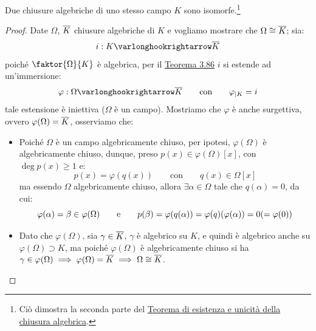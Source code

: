 \documentclass[11pt]{scrartcl}
\begin{document}
\pagebreak

\begin{corollary}
Due chiusure algebriche di uno stesso campo $K$ sono isomorfe.\footnote{Ciò dimostra la seconda parte del \hyperref[3.25]{Teorema di esistenza e unicità della chiusura algebrica}.}
\end{corollary}

\begin{proof}
Date $\Omega$, $\overline K$ chiusure algebriche di $K$ e vogliamo mostrare che $\Omega \cong \overline K$; sia:
\[ i : K \varlonghookrightarrow \ol K
    \]
poiché $\faktor{\Omega}{K}$ è algebrica, per il \hyperref[3.86]{Teorema 3.86} $i$ si estende ad un'immersione:
\[ \varphi : \Omega \varlonghookrightarrow \ol K \qquad \text{con} \qquad \varphi_{|K} = i
    \]
tale estensione è iniettiva ($\Omega$ è un campo). Mostriamo che $\varphi$ è anche surgettiva, ovvero $\varphi(\Omega) = \overline K$, osserviamo che:
\begin{itemize}
    \item Poiché $\Omega$ è un campo algebricamente chiuso, per ipotesi, $\varphi(\Omega)$ è algebricamente chiuso, dunque, preso $p(x) \in \varphi(\Omega)[x]$, con $\deg p(x) \geq 1$ e:
    \[ p(x) = \varphi(q(x)) \qquad \text{con} \qquad q(x) \in \Omega[x]
        \]
    ma essendo $\Omega$ algebricamente chiuso, allora $\exists \alpha \in \Omega$ tale che $q(\alpha) = 0$, da cui:
    \[ \varphi(\alpha) = \beta \in \varphi(\Omega) \qquad \text e \qquad p(\beta) = \varphi(q(\alpha)) = \varphi(q)(\varphi(\alpha)) = 0 (= \varphi(0))
        \]
    \item Dato che $\varphi(\Omega)$, sia $\gamma \in \overline K$, $\gamma$ è algebrico su $K$, e quindi è algebrico anche su $\varphi(\Omega) \supset K$, ma poiché $\varphi(\Omega)$ è algebricamente chiuso si ha 
    $\gamma \in \varphi(\Omega) \implies \varphi(\Omega) = \overline K \implies \Omega \cong \overline K$.
\end{itemize}
\end{proof}
\end{document}
